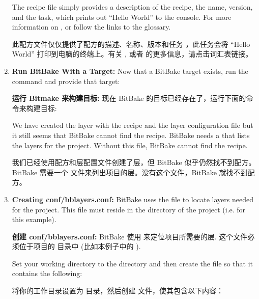 \begin{enumerate}
\medskip
The recipe file simply provides a description of the recipe, the name, version, and the  task, which prints out “Hello World” to the console. For more information on ,  or  follow the links to the glossary.

\medskip
此配方文件仅仅提供了配方的描述、名称、版本和任务 ，此任务会将 ``Hello World'' 打印到电脑的终端上。有关 ,  或者  的更多信息，请点击词汇表链接。

\item \textbf{Run BitBake With a Target:} Now that a BitBake target exists, run the command and provide that target:

\medskip
\textbf{运行 Bitmake 来构建目标:} 现在 BitBake 的目标已经存在了，运行下面的命令来构建目标:

\medskip
{}

\medskip
We have created the layer with the recipe and the layer configuration file but it still seems that BitBake cannot find the recipe. BitBake needs a  that lists the layers for the project. Without this file, BitBake cannot find the recipe.

\medskip
我们已经使用配方和层配置文件创建了层，但 BitBake 似乎仍然找不到配方。BitBake 需要一个  文件来列出项目的层。没有这个文件，BitBake 就找不到配方。

\item \textbf{Creating conf/bblayers.conf:} BitBake uses the  file to locate layers needed for the project. This file must reside in the  directory of the project (i.e.  for this example).

\medskip
\textbf{创建 conf/bblayers.conf:} BitBake 使用  来定位项目所需要的层. 这个文件必须位于项目的  目录中 (比如本例子中的 ).

\medskip
Set your working directory to the  directory and then create the  file so that it contains the following:

\medskip
将你的工作目录设置为  目录，然后创建  文件，使其包含以下内容：


\end{enumerate}
